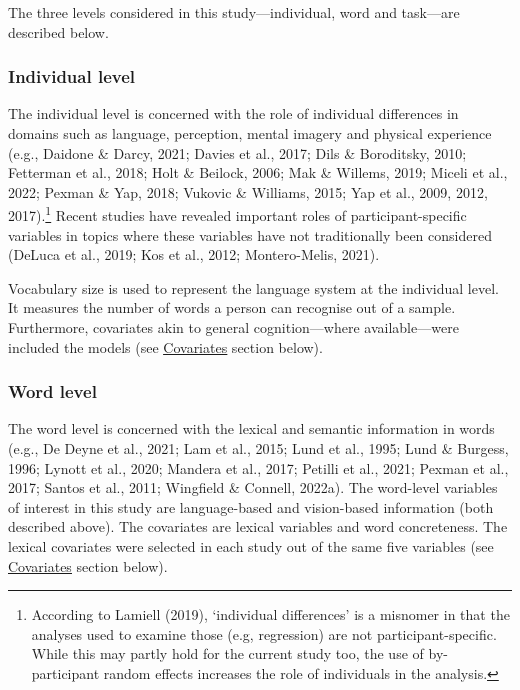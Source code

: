 \documentclass[
  12pt,
  man,floatsintext]{apa7}
\begin{document}
The three levels considered in this study---individual, word and task---are described below.

\hypertarget{individual-level}{%
\subsubsection{Individual level}\label{individual-level}}

The individual level is concerned with the role of individual differences in domains such as language, perception, mental imagery and physical experience (e.g., Daidone \& Darcy, 2021; Davies et al., 2017; Dils \& Boroditsky, 2010; Fetterman et al., 2018; Holt \& Beilock, 2006; Mak \& Willems, 2019; Miceli et al., 2022; Pexman \& Yap, 2018; Vukovic \& Williams, 2015; Yap et al., 2009, 2012, 2017).\footnote{According to Lamiell (2019), `individual differences' is a misnomer in that the analyses used to examine those (e.g, regression) are not participant-specific. While this may partly hold for the current study too, the use of by-participant random effects increases the role of individuals in the analysis.} Recent studies have revealed important roles of participant-specific variables in topics where these variables have not traditionally been considered (DeLuca et al., 2019; Kos et al., 2012; Montero-Melis, 2021).

Vocabulary size is used to represent the language system at the individual level. It measures the number of words a person can recognise out of a sample. Furthermore, covariates akin to general cognition---where available---were included the models (see \protect\hyperlink{covariates}{\underline{Covariates}} section below).

\hypertarget{word-level}{%
\subsubsection{Word level}\label{word-level}}

The word level is concerned with the lexical and semantic information in words (e.g., De Deyne et al., 2021; Lam et al., 2015; Lund et al., 1995; Lund \& Burgess, 1996; Lynott et al., 2020; Mandera et al., 2017; Petilli et al., 2021; Pexman et al., 2017; Santos et al., 2011; Wingfield \& Connell, 2022a). The word-level variables of interest in this study are language-based and vision-based information (both described above). The covariates are lexical variables and word concreteness. The lexical covariates were selected in each study out of the same five variables (see \protect\hyperlink{covariates}{\underline{Covariates}} section below).
\end{document}
